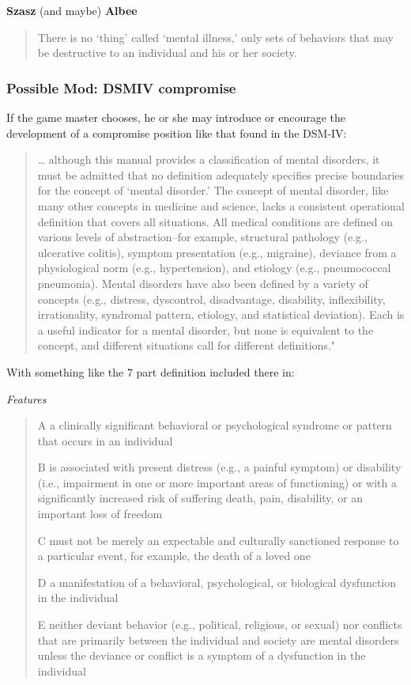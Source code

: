 \textbf{Szasz} (and maybe) \textbf{Albee}

\begin{quote}

There is no `thing' called `mental illness,' only sets of behaviors that may be destructive to an individual and his or her society.
\end{quote}

\subsubsection{Possible Mod: DSMIV compromise}
\label{possiblemod:dsmivcompromise}

If the game master chooses, he or she may introduce or encourage the development of a compromise position like that found in the DSM-IV: 

\begin{quote}

{\ldots} although this manual provides a classification of mental disorders, it must be admitted that no definition adequately specifies precise boundaries for the concept of `mental disorder.' The concept of mental disorder, like many other concepts in medicine and science, lacks a consistent operational definition that covers all situations. All medical conditions are defined on various levels of abstraction--for example, structural pathology (e.g., ulcerative colitis), symptom presentation (e.g., migraine), deviance from a physiological norm (e.g., hypertension), and etiology (e.g., pneumococcal pneumonia). Mental disorders have also been defined by a variety of concepts (e.g., distress, dyscontrol, disadvantage, disability, inflexibility, irrationality, syndromal pattern, etiology, and statistical deviation). Each is a useful indicator for a mental disorder, but none is equivalent to the concept, and different situations call for different definitions." 
\end{quote}

With something like the 7 part definition included there in:

\emph{Features}

\begin{quote}

A a clinically significant behavioral or psychological syndrome or pattern that occurs in an individual

B is associated with present distress (e.g., a painful symptom) or disability (i.e., impairment in one or more important areas of functioning) or with a significantly increased risk of suffering death, pain, disability, or an important loss of freedom

C must not be merely an expectable and culturally sanctioned response to a particular event, for example, the death of a loved one

D a manifestation of a behavioral, psychological, or biological dysfunction in the individual

E neither deviant behavior (e.g., political, religious, or sexual) nor conflicts that are primarily between the individual and society are mental disorders unless the deviance or conflict is a symptom of a dysfunction in the individual
\end{quote}

